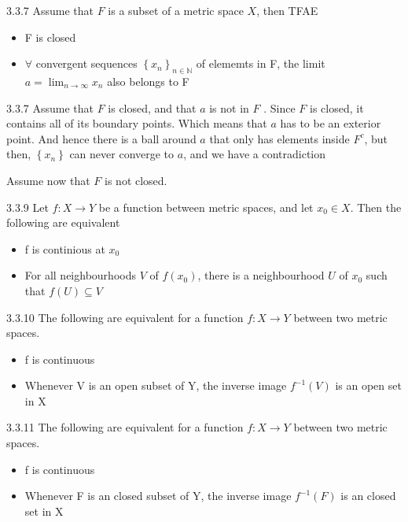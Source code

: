 \documentclass[a4paper,norsk]{article}
\begin{document}
\begin{propositionbox}{3.3.7}{}
Assume that $ F $ is a subset of a metric space $ X $, then TFAE
\begin{itemize}
  \item F is closed
  \item $ \forall $ convergent sequences $ \left\{ x_n \right\} _{ n \in  \mathbb{N}} $ of elememts in F, the limit $ a = \lim_{n \to \infty} x_n  $ also belongs to F
\end{itemize}

\begin{proofbox}{3.3.7}{}
  Assume that $ F $  is closed, and that $ a $  is not in $ F $ . Since $ F $  is closed, it contains all of its boundary points. Which means that $ a $  has to be an exterior point. And hence there is a ball around $ a $ that only has elements inside $ F^c $, but then, $ \left\{ x_n \right\}  $ can never converge to $ a $, and we have a contradiction


  Assume now that $ F $ is not closed. 
\end{proofbox}
\end{propositionbox}




\begin{propositionbox}{3.3.9}{}
Let $ f: X \rightarrow Y $ be a function between metric spaces, and let $ x_0 \in X $. Then the following are equivalent

\begin{itemize}
  \item f is continious at $ x_0 $ 
  \item For all neighbourhoods $ V $ of $ f(x_0) $, there is a neighbourhood $ U $ of $ x_0 $ such that $ f(U) \subseteq V $ 
\end{itemize}
\end{propositionbox}

\begin{propositionbox}{3.3.10}{}
The following are equivalent for a function $ f : X \rightarrow Y $ between two metric spaces.
\begin{itemize}
  \item f is continuous
  \item Whenever V is an open subset of Y, the inverse image $ f^{-1} (V)  $ is an open set in X
\end{itemize}
\end{propositionbox}

\begin{propositionbox}{3.3.11}{}
The following are equivalent for a function $ f : X \rightarrow Y $ between two metric spaces.
\begin{itemize}
  \item f is continuous
  \item Whenever F is an closed subset of Y, the inverse image $ f^{-1} (F)  $ is an closed set in X
\end{itemize}
\end{propositionbox}
\end{document}
